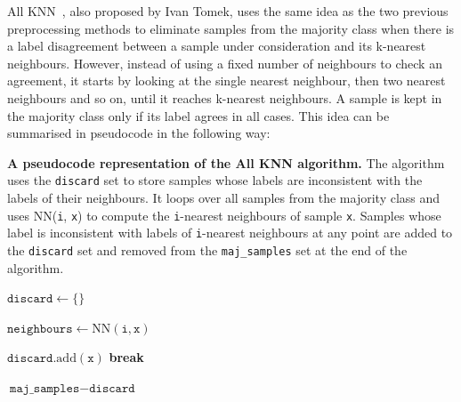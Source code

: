 All KNN~\cite{repeated-enn}, also proposed by Ivan Tomek, uses the same idea as the two previous
preprocessing methods to eliminate samples from the majority class when there is a label
disagreement between a sample under consideration and its k-nearest neighbours. However, instead of
using a fixed number of neighbours to check an agreement, it starts by looking at the single
nearest neighbour, then two nearest neighbours and so on, until it reaches k-nearest neighbours. A
sample is kept in the majority class only if its label agrees in all cases. This idea can be
summarised in pseudocode in the following way:

\begin{algorithm}
    \caption{
        \textbf{A pseudocode representation of the All KNN algorithm.} The algorithm uses the
        \texttt{discard} set to store samples whose labels are inconsistent with the labels of
        their neighbours. It loops over all samples from the majority class and uses
        \textrm{NN}(\texttt{i}, \texttt{x}) to compute the \texttt{i}-nearest neighbours of sample
        \texttt{x}. Samples whose label is inconsistent with labels of \texttt{i}-nearest
        neighbours at any point are added to the \texttt{discard} set and removed from the
        \texttt{maj\_samples} set at the end of the algorithm.
    }
    \label{algorithm:all-knn}

    \begin{algorithmic}
            \State $\texttt{discard} \gets \{\}$

                    \State $\texttt{neighbours} \gets \textrm{NN}(\texttt{i}, \texttt{x})$

                        \State $\texttt{discard}.\textrm{add}(\texttt{x})$
                        \State \textbf{break}
                    \EndIf
                \EndFor
            \EndFor

            \State \Return $\texttt{maj\_samples} - \texttt{discard}$
        \EndFunction
    \end{algorithmic}
\end{algorithm}

